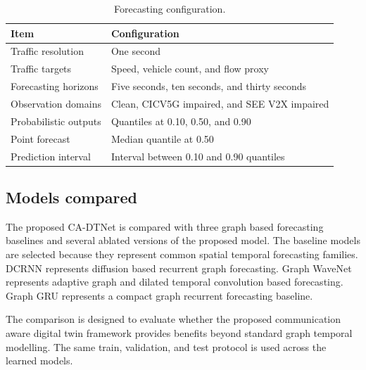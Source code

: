 \documentclass[pdflatex,sn-mathphys-num]{sn-jnl}%
\theoremstyle{thmstyleone}%
\theoremstyle{thmstyletwo}%
\theoremstyle{thmstylethree}%
\begin{document}
\begin{table}[htbp]
\centering
\caption{Forecasting configuration.}
\label{tab:forecasting_configuration}
\small
\begin{tabular}{p{4.0cm} p{7.0cm}}
\hline
Item & Configuration \\
\hline
Traffic resolution & One second \\
Traffic targets & Speed, vehicle count, and flow proxy \\
Forecasting horizons & Five seconds, ten seconds, and thirty seconds \\
Observation domains & Clean, CICV5G impaired, and SEE V2X impaired \\
Probabilistic outputs & Quantiles at 0.10, 0.50, and 0.90 \\
Point forecast & Median quantile at 0.50 \\
Prediction interval & Interval between 0.10 and 0.90 quantiles \\
\hline
\end{tabular}
\end{table}

\subsection{Models compared}
\label{subsec:models_compared}

The proposed CA-DTNet is compared with three graph based forecasting baselines and several ablated versions of the proposed model. The baseline models are selected because they represent common spatial temporal forecasting families. DCRNN represents diffusion based recurrent graph forecasting. Graph WaveNet represents adaptive graph and dilated temporal convolution based forecasting. Graph GRU represents a compact graph recurrent forecasting baseline.

The comparison is designed to evaluate whether the proposed communication aware digital twin framework provides benefits beyond standard graph temporal modelling. The same train, validation, and test protocol is used across the learned models.
\end{document}
